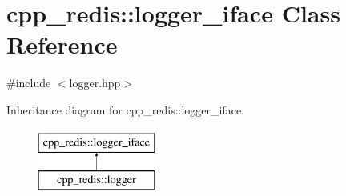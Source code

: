 \hypertarget{classcpp__redis_1_1logger__iface}{}\section{cpp\+\_\+redis\+:\+:logger\+\_\+iface Class Reference}
\label{classcpp__redis_1_1logger__iface}


{\ttfamily \#include $<$logger.\+hpp$>$}

Inheritance diagram for cpp\+\_\+redis\+:\+:logger\+\_\+iface\+:\begin{figure}[H]
\begin{center}
\leavevmode
\includegraphics[height=2.000000cm]{classcpp__redis_1_1logger__iface}
\end{center}
\end{figure}
